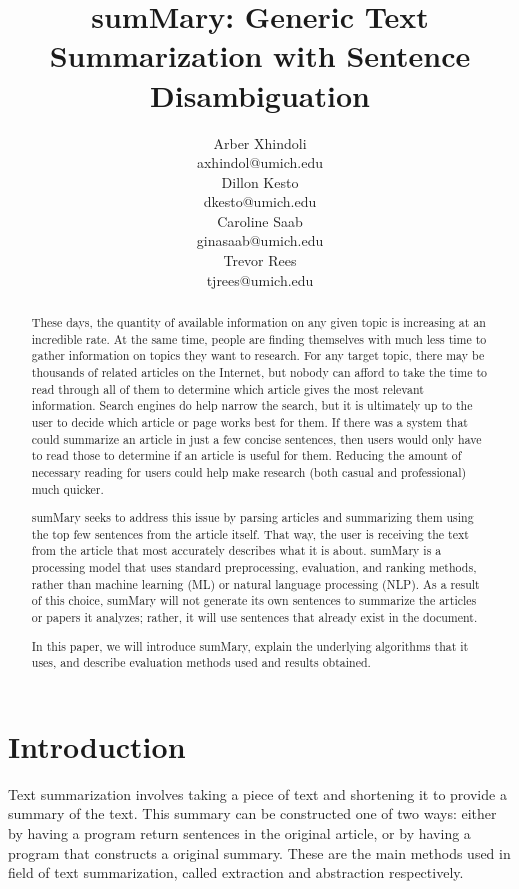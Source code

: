 \documentclass[11pt,a4paper]{article}
\title{sumMary: Generic Text Summarization with Sentence Disambiguation}
\author{Arber Xhindoli \\
    {axhindol@umich.edu} \\\And
    Dillon Kesto \\
    {dkesto@umich.edu}  \\\And
    Caroline Saab \\
    {ginasaab@umich.edu} \\\And
    Trevor Rees \\
    {tjrees@umich.edu} \\
    }
\date{}
\begin{document}
  \maketitle
  \begin{abstract}
   These days, the quantity of available information on any given topic is increasing at an incredible rate. At the same time, people are finding themselves with much less time to gather information on topics they want to research. For any target topic, there may be thousands of related articles on the Internet, but nobody can afford to take the time to read through all of them to determine which article gives the most relevant information. Search engines do help narrow the search, but it is ultimately up to the user to decide which article or page works best for them. If there was a system that could summarize an article in just a few concise sentences, then users would only have to read those to determine if an article is useful for them. Reducing the amount of necessary reading for users could help make research (both casual and professional) much quicker.

  sumMary seeks to address this issue by parsing articles and summarizing them using the top few sentences from the article itself. That way, the user is receiving the text from the article that most accurately describes what it is about. sumMary is a processing model that uses standard preprocessing, evaluation, and ranking methods, rather than machine learning (ML) or natural language processing (NLP). As a result of this choice, sumMary will not generate its own sentences to summarize the articles or papers it analyzes; rather, it will use sentences that already exist in the document.

  In this paper, we will introduce sumMary, explain the underlying algorithms that it uses, and describe evaluation methods used and results obtained.
  \end{abstract}
  \section{Introduction}

  Text summarization involves taking a piece of text and shortening it to provide a summary of the text. This summary can be constructed one of two ways: either by having a program return sentences in the original article, or by having a program that constructs a original summary. These are the main methods used in field of text summarization, called extraction and abstraction respectively.
\end{document}

